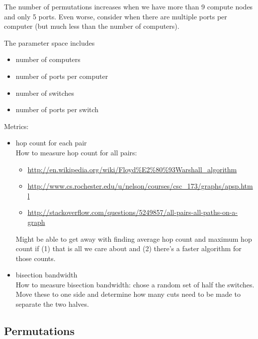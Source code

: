 \documentclass[pdftex]{article}
\begin{document}
The number of permutations increases when we have more than 9 compute nodes and only 5 ports. Even worse, consider when there are multiple ports per computer (but much less than the number of computers).

The parameter space includes
\begin{itemize}
 \item number of computers
 \item number of ports per computer
 \item number of switches
 \item number of ports per switch
\end{itemize}
Metrics:
\begin{itemize}
 \item hop count for each pair\\
 How to measure hop count for all pairs:
\begin{itemize}
 \item \href{http://en.wikipedia.org/wiki/Floyd\%E2\%80\%93Warshall_algorithm}{http://en.wikipedia.org/wiki/Floyd\%E2\%80\%93Warshall\_algorithm}
 \item \href{http://www.cs.rochester.edu/u/nelson/courses/csc_173/graphs/apsp.html}{http://www.cs.rochester.edu/u/nelson/courses/csc\_173/graphs/apsp.html}
 \item \href{http://stackoverflow.com/questions/5249857/all-pairs-all-paths-on-a-graph}{http://stackoverflow.com/questions/5249857/all-pairs-all-paths-on-a-graph}
\end{itemize}
Might be able to get away with finding average hop count and maximum hop count if (1) that is all we care about and (2) there's a faster algorithm for those counts.
 \item bisection bandwidth\\
 How to measure bisection bandwidth: chose a random set of half the switches. Move these to one side and determine how many cuts need to be made to separate the two halves.
\end{itemize}


\subsection{Permutations}
\end{document}
